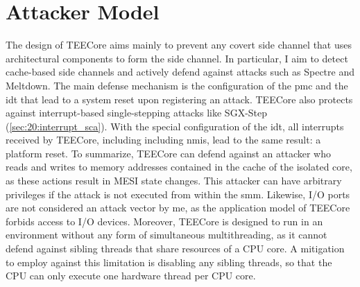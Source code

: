 \section{Attacker Model}
\label{sec:30:tee_attacker_model}
The design of TEECore aims mainly to prevent any covert side channel that uses
architectural components to form the side channel. In particular, I aim to
detect cache-based side channels and actively defend against attacks such as
Spectre and Meltdown. The main defense mechanism is the configuration of the
\gls{pmc} and the \gls{idt} that lead to a system reset upon registering an
attack.
TEECore also protects against interrupt-based single-stepping attacks like
SGX-Step (\ref{sec:20:interrupt_sca}). With the special configuration of the
\gls{idt}, all interrupts received by TEECore, including including \glspl{nmi},
lead to the same result: a platform reset. To summarize, TEECore can defend
against an attacker who reads and writes to memory addresses contained in the
cache of the isolated core, as these actions result in MESI state changes. This
attacker can have arbitrary privileges if the attack is not executed from within
the \gls{smm}. Likewise, I/O ports are not considered an attack vector by me, as
the application model of TEECore forbids access to I/O devices. Moreover,
TEECore is designed to run in an environment without any form of simultaneous
multithreading, as it cannot defend against sibling threads that share resources
of a CPU core. A mitigation to employ against this limitation is disabling any
sibling threads, so that the CPU can only execute one hardware thread per CPU
core.\\

